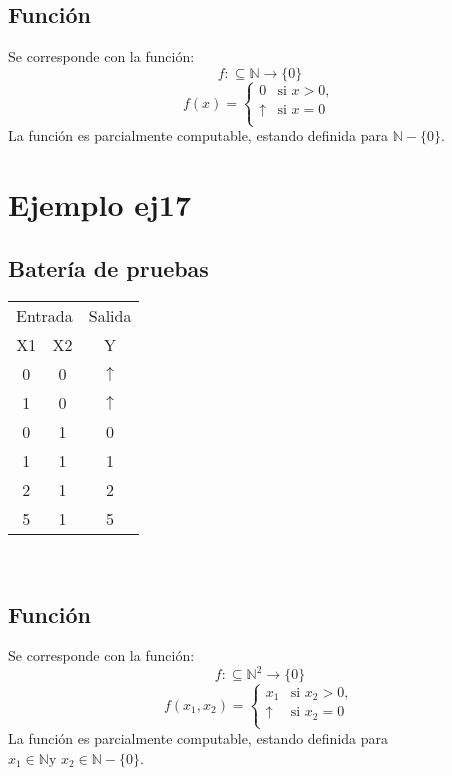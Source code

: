 \documentclass[a4paper]{article}
\begin{document}
  			\subsection{Función}
  				Se corresponde con la función:
  				$$f:\subseteq \mathbb{N} \longrightarrow \{0\}$$
  				\begin{equation*}
  					f(x) = \left\{
  					\begin{array}{rl}
  						0 & \text{si } x>0, \\
  						\uparrow & \text{si } x=0 \\
  					\end{array} \right.
  				\end{equation*}
  				La función es parcialmente computable, estando definida para $\mathbb{N}-\{0\}$.

  		\section{Ejemplo ej17}
  			\subsection{Batería de pruebas}
  			\begin{center}
  				\begin{tabular}{|c|c|c|} \hline
  					\multicolumn{2}{|l|}{Entrada}&\multicolumn{1}{l|}{Salida}\\
  				X1 & X2 & Y \\
  					\hline
  				0 & 0 & $\uparrow$ \\
  				1 & 0 & $\uparrow$ \\
  				0 & 1 & 0 \\
  				1 & 1 & 1 \\
  				2 & 1 & 2 \\
  				5 & 1 & 5 \\
  					\hline
  				\end{tabular}\\
  			\end{center}
  			\subsection{Función}
  				Se corresponde con la función:
  				$$f:\subseteq \mathbb{N}^2 \longrightarrow \{0\}$$
  				\begin{equation*}
  					f(x_1, x_2) = \left\{
  					\begin{array}{rl}
  						x_1 & \text{si } x_2 > 0, \\
  						\uparrow & \text{si } x_2=0 \\
  					\end{array} \right.
  				\end{equation*}
  				La función es parcialmente computable, estando definida para $x_1 \in \mathbb{N} \text{y } x_2 \in \mathbb{N}-\{0\}$.
\end{document}
